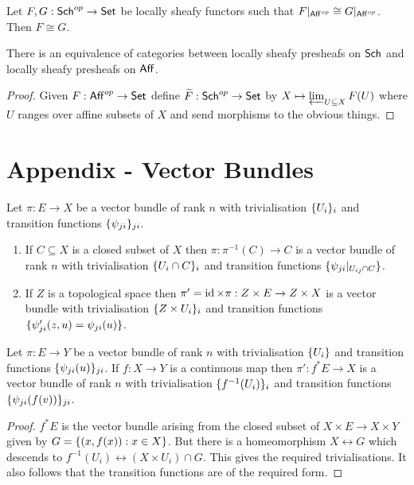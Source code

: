 \documentclass{memoir}
\begin{document}
\begin{corollary}
    Let $F,G:{\normalfont\mathsf{Sch}}^{op}\to {\normalfont\mathsf{Set}}$ be locally sheafy functors such that $F|_{{\normalfont\mathsf{Aff}}^{op}} \cong G|_{{\normalfont\mathsf{Aff}}^{op}}$.
    Then $F\cong G$.
\end{corollary}
\begin{conjecture}
    There is an equivalence of categories between locally sheafy presheafs on ${\normalfont\mathsf{Sch}}$ and locally sheafy presheafs on ${\normalfont\mathsf{Aff}}$.
\end{conjecture}
\begin{proof}
    Given $F:{\normalfont\mathsf{Aff}}^{op}\to {\normalfont\mathsf{Set}}$ define $\widetilde F:{\normalfont\mathsf{Sch}}^{op}\to {\normalfont\mathsf{Set}}$ by $X\mapsto \varprojlim_{U\subseteq X}F(U)$ where $U$ ranges over affine subsets of $X$ and send morphisms to the obvious things.
\end{proof}
\chapter{Appendix - Vector Bundles}
\begin{proposition}
    Let $\pi:E\to X$ be a vector bundle of rank $n$ with trivialisation $\lbrace U_i\rbrace_i$ and transition functions $\lbrace\psi_{ji}\rbrace_{ji}$.
    \begin{enumerate}
        \item If $C\subseteq X$ is a closed subset of $X$ then $\pi:\pi^{-1}(C)\to C$ is a vector bundle of rank $n$ with trivialisation $\lbrace U_i\cap C\rbrace_i$ and transition functions $\lbrace\psi_{ji}|_{U_{ij}\cap C}\rbrace$.
        \item If $Z$ is a topological space then $\pi'=\operatorname{id}\times\pi:Z\times E\to Z\times X$ is a vector bundle with trivialisation $\lbrace Z\times U_i\rbrace_i$ and transition functions $\lbrace\psi_{ji}'(z,u) = \psi_{ji}(u)\rbrace$.
    \end{enumerate}
\end{proposition}
\begin{corollary}
    Let $\pi:E\to Y$ be a vector bundle of rank $n$ with trivialisation $\lbrace U_i\rbrace$ and transition functions $\lbrace\psi_{ji}(u)\rbrace_{ji}$.
    If $f:X\to Y$ is a continuous map then $\pi':f^*E\to X$ is a vector bundle of rank $n$ with trivialisation $\lbrace f^{-1}(U_i)\rbrace_i$ and transition functions $\lbrace\psi_{ji}(f(v))\rbrace_{ji}$.
\end{corollary}
\begin{proof}
    $f^*E$ is the vector bundle arising from the closed subset of $X\times E\to X\times Y$ given by $G = \lbrace(x,f(x)):x\in X\rbrace$.
    But there is a homeomorphism $X\leftrightarrow G$ which descends to $f^{-1}(U_{i})\leftrightarrow (X\times U_{i})\cap G$.
    This gives the required trivialisations.
    It also follows that the transition functions are of the required form.
\end{proof}
\end{document}
